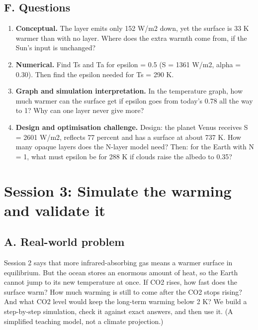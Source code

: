 \documentclass[11pt,a4paper]{article}
\begin{document}
\subsection*{F. Questions}
\begin{enumerate}[nosep]
\item \textbf{Conceptual.} The layer emits only 152 W/m2 down, yet the surface is 33 K warmer than with no layer. Where does the extra warmth come from, if the Sun's input is unchanged?
\item \textbf{Numerical.} Find Ts and Ta for epsilon = 0.5 (S = 1361 W/m2, alpha = 0.30). Then find the epsilon needed for Ts = 290 K.
\item \textbf{Graph and simulation interpretation.} In the temperature graph, how much warmer can the surface get if epsilon goes from today's 0.78 all the way to 1? Why can one layer never give more?
\item \textbf{Design and optimisation challenge.} Design: the planet Venus receives S = 2601 W/m2, reflects 77 percent and has a surface at about 737 K. How many opaque layers does the N-layer model need? Then: for the Earth with N = 1, what must epsilon be for 288 K if clouds raise the albedo to 0.35?
\end{enumerate}

\section{Session 3: Simulate the warming and validate it}

\subsection*{A. Real-world problem}
Session 2 says that more infrared-absorbing gas means a warmer surface in equilibrium. But the ocean stores an enormous amount of heat, so the Earth cannot jump to its new temperature at once. If CO2 rises, how fast does the surface warm? How much warming is still to come after the CO2 stops rising? And what CO2 level would keep the long-term warming below 2 K? We build a step-by-step simulation, check it against exact answers, and then use it. (A simplified teaching model, not a climate projection.)
\end{document}
